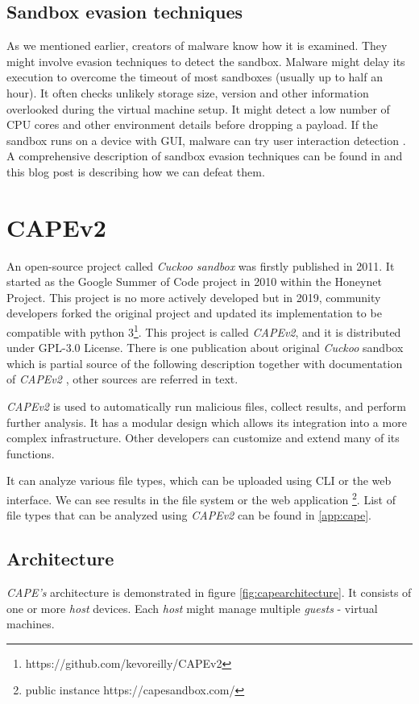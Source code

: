 \subsection{Sandbox evasion techniques}
As we mentioned earlier, creators of malware know how it is examined. They might involve evasion techniques to detect the sandbox. Malware might delay its execution to overcome the timeout of most sandboxes (usually up to half an hour). It often checks unlikely storage size, version and other information overlooked during the virtual machine setup. It might detect a low number of CPU cores and other environment details before dropping a payload. If the sandbox runs on a device with GUI, malware can try user interaction detection \cite{Evolutio45:online}. A comprehensive description of sandbox evasion techniques can be found in \cite{Afianian2018} and this blog post \cite{Chailytko2019} is describing how we can defeat them.

\section{CAPEv2}
An open-source project called \emph{Cuckoo sandbox} was firstly published in 2011. It started as the Google Summer of Code project in 2010 within the Honeynet Project. This project is no more actively developed but in 2019, community developers forked the original project and updated its implementation to be compatible with python 3\footnote{https://github.com/kevoreilly/CAPEv2}. This project is called \emph{CAPEv2}, and it is distributed under GPL-3.0 License. There is one publication about original \emph{Cuckoo} sandbox \cite{Oktavianto2013} which is partial source of the following description together with documentation of \emph{CAPEv2} \cite{CAPESand75:online}, other sources are referred in text.

\emph{CAPEv2} is used to automatically run malicious files, collect results, and perform further analysis. It has a modular design which allows its integration into a more complex infrastructure. Other developers can customize and extend many of its functions.

It can analyze various file types, which can be uploaded using CLI  or the web interface. We can see results in the file system or the web application \footnote{public instance https://capesandbox.com/}. List of file types that can be analyzed using \emph{CAPEv2} can be found in \ref{app:cape}.


\subsection{Architecture}
\emph{CAPE's} architecture is demonstrated in figure \ref{fig:capearchitecture}. It consists of one or more \emph{host} devices. Each \emph{host} might manage multiple \emph{guests} - virtual machines. 

